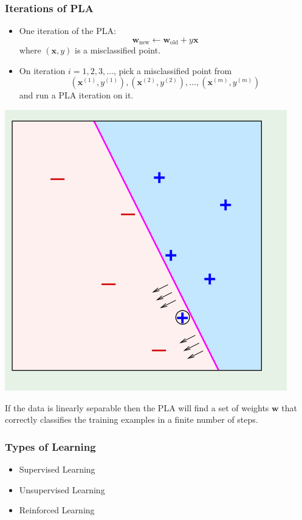 \documentclass[xcolor=table]{beamer}
\newcommand{\vect}[1]{\ensuremath{\mathbf{#1}}}
\begin{document}
\begin{frame}[t]
\frametitle{Iterations of PLA}
\parbox[t]{7cm}{
    \begin{itemize}
        \item One iteration of the PLA:
            \[ \vect{w}_{\text{new}} \leftarrow \vect{w}_{\text{old}} + y \vect{x}\]
        where $(\vect{x}, y)$ is a misclassified point.

        \item On iteration $i = 1, 2, 3, \ldots$, pick a misclassified point from 
            \[(\vect{x}^{(1)}, y^{(1)}), (\vect{x}^{(2)}, y^{(2)}), \ldots,
            (\vect{x}^{(m)}, y^{(m)})\]
        and run a PLA iteration on it. 
    \end{itemize}
}
\hfill
\parbox[t]{4cm}{
\begin{center}
    \includegraphics[scale=0.20]{PLA_iterations.png}
\end{center}
}

\begin{theorem}[Convergence]
If the data is linearly separable then the PLA will find a set of weights $\vect{w}$
that correctly classifies the training examples in a finite number of steps. 
\end{theorem}
\end{frame}

\begin{frame}[t]
\frametitle{Types of Learning}
\begin{itemize}
    \item Supervised Learning
    \item Unsupervised Learning
    \item Reinforced Learning 
\end{itemize}
\end{frame}
\end{document}
